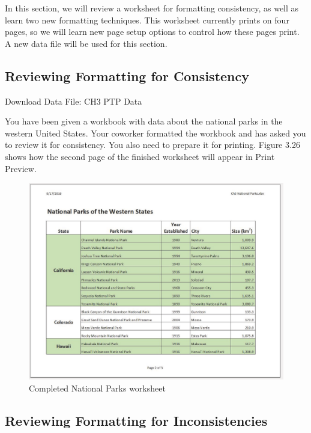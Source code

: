 In this section, we will review a worksheet for formatting consistency, as well as learn two new
formatting techniques. This worksheet currently prints on four pages, so we will learn new page setup
options to control how these pages print. A new data file will be used for this section.

\subsection{Reviewing Formatting for Consistency}

Download Data File: CH3 PTP Data

You have been given a workbook with data about the national parks in the western United States.
Your coworker formatted the workbook and has asked you to review it for consistency. You also need
to prepare it for printing. Figure 3.26 shows how the second page of the finished worksheet will
appear in Print Preview.



\begin{figure}[H]
	\centering
	\includegraphics[width=\maxwidth{.95\linewidth}]{gfx/ch03_fig26}
	\caption{Completed National Parks worksheet}
	\label{03:fig26}
\end{figure}



\subsection{Reviewing Formatting for Inconsistencies}

